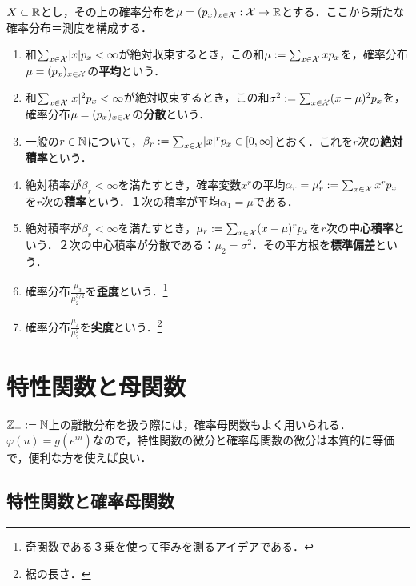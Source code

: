 \documentclass[uplatex,dvipdfmx]{jsreport}
\begin{document}
\begin{definition}
    $X\subset\mathbb{R}$とし，その上の確率分布を$\mu=(p_x)_{x\in\mathcal{X}}:\mathcal{X}\to\mathbb{R}$とする．ここから新たな確率分布＝測度を構成する．
    \begin{enumerate}
        \item 和$\sum_{x\in\mathcal{X}}\lvert x\rvert p_x<\infty$が絶対収束するとき，この和$\mu:=\sum_{x\in\mathcal{X}}xp_x$を，確率分布$\mu=(p_x)_{x\in\mathcal{X}}$の\textbf{平均}という．
        \item 和$\sum_{x\in\mathcal{X}}\lvert x\rvert^2p_x<\infty$が絶対収束するとき，この和$\sigma^2:=\sum_{x\in\mathcal{X}}(x-\mu)^2p_x$を，確率分布$\mu=(p_x)_{x\in\mathcal{X}}$の\textbf{分散}という．
        \item 一般の$r\in\mathbb{N}$について，$\beta_r:=\sum_{x\in\mathcal{X}}\lvert x\rvert^rp_x\in[0,\infty]$とおく．これを$r$次の\textbf{絶対積率}という．
        \item 絶対積率が$\beta_r<\infty$を満たすとき，確率変数$x^r$の平均$\alpha_r=\mu'_r:=\sum_{x\in\mathcal{X}}x^rp_x$を$r$次の\textbf{積率}という．１次の積率が平均$\alpha_1=\mu$である．
        \item 絶対積率が$\beta_r<\infty$を満たすとき，$\mu_r:=\sum_{x\in\mathcal{X}}(x-\mu)^rp_x$を$r$次の\textbf{中心積率}という．２次の中心積率が分散である：$\mu_2=\sigma^2$．その平方根を\textbf{標準偏差}という．
        \item 確率分布$\frac{\mu_3}{\mu_2^{3/2}}$を\textbf{歪度}という．\footnote{奇関数である３乗を使って歪みを測るアイデアである．}
        \item 確率分布$\frac{\mu_4}{\mu_2^2}$を\textbf{尖度}という．\footnote{裾の長さ．}
    \end{enumerate}
\end{definition}

\section{特性関数と母関数}

\begin{tcolorbox}[colframe=ForestGreen, colback=ForestGreen!10!white,breakable,colbacktitle=ForestGreen!40!white,coltitle=black,fonttitle=\bfseries\sffamily,
title=]
    $\mathbb{Z}_+:=\mathbb{N}$上の離散分布を扱う際には，確率母関数もよく用いられる．
    $\varphi(u)=g(e^{iu})$なので，特性関数の微分と確率母関数の微分は本質的に等価で，便利な方を使えば良い．
\end{tcolorbox}

\subsection{特性関数と確率母関数}
\end{document}
